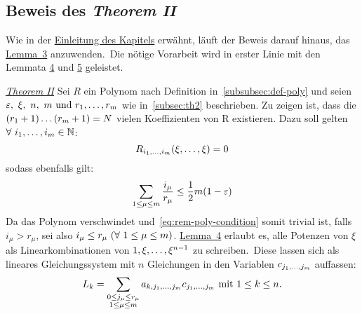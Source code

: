     
    
    \subsection{Beweis des \emph{Theorem II}}
        \label{subsec:proof-th2}
        \textrm{Wie in der \hyperref[sec:th2]{Einleitung des Kapitels} erwähnt, läuft der Beweis darauf hinaus, das
        \hyperref[subsec:lemma3]{Lemma~3} anzuwenden.\ Die nötige Vorarbeit wird in erster Linie mit den Lemmata
        \hyperref[subsec:lemma4]{4} und \hyperref[subsec:lemma5]{5} geleistet.}
        \begin{namedproof}{\emph{\hyperref[subsec:th2]{Theorem II}}}
            Sei $R$ ein Polynom nach Definition in~\ref{subsubsec:def-poly} und seien $\varepsilon,\ \xi,\ n,\ m \ \textrm{und}\  r_1, \dots, r_m$ wie in~\ref{subsec:th2} beschrieben.
            \newline
            Zu zeigen ist, dass die $(r_1+1) \dots (r_m+1) = N$ vielen Koeffizienten von R existieren.
            \newline 
            Dazu soll gelten $\forall \ i_1, \dots, i_m \in \mathbb{N}$:
            \begin{equation}
                R_{i_1, \dots, i_m}(\xi, \dots, \xi) = 0 \label{eq:rem-poly-condition}
            \end{equation}
            sodass ebenfalls gilt:
            \begin{equation}
                \sum_{1 \leq \mu \leq m} \frac{i_\mu}{r_\mu} \leq \frac{1}{2} m(1 - \varepsilon) \label{eq:ind-condition}
            \end{equation}
            Da das Polynom verschwindet und~\eqref{eq:rem-poly-condition} somit trivial ist, falls $i_\mu > r_\mu$, sei
            also $i_\mu \leq r_\mu \ (\forall \  1 \leq \mu \leq m)$.
            \newline
            \hyperref[subsec:lemma4]{Lemma~4} erlaubt es, alle Potenzen von $\xi$ als Linearkombinationen von $1, \xi, \dots, \xi^{n-1}$ zu schreiben.\ Diese lassen sich als lineares Gleichungssystem mit $n$ Gleichungen in den
            Variablen $c_{j_1, \dots, j_m}$ auffassen:
            \begin{equation*}
                L_k = \sum_{\substack{0 \leq j_\mu \leq r_\mu \\ 1 \leq \mu \leq m}} a_{k, j_1, \dots, j_m} c_{j_1, \dots, j_m} \ \textrm{mit}\  1 \leq k \leq n.
            \end{equation*}

\end{namedproof}
